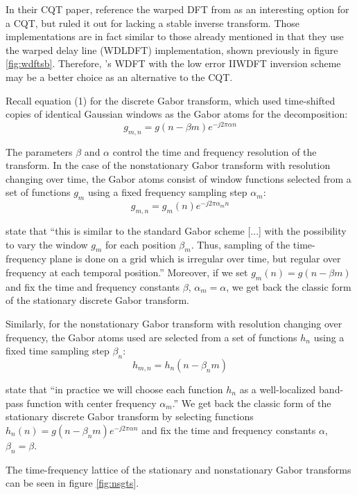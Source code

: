 \documentclass[letter,12pt,notitlepage]{article}
\begin{document}
In their CQT paper, \citet{klapuricqt} reference the warped DFT from \citet{warpedold1, warpedold2} as an interesting option for a CQT, but ruled it out for lacking a stable inverse transform. Those implementations are in fact similar to those already mentioned \cite{earlywarped1, earlywarped2} in that they use the warped delay line (WDLDFT) implementation, shown previously in figure \ref{fig:wdftsb}. Therefore, \citet{warped2}'s WDFT with the low error IIWDFT inversion scheme may be a better choice as an alternative to the CQT.

Recall equation (1) for the discrete Gabor transform, which used time-shifted copies of identical Gaussian windows as the Gabor atoms for the decomposition:
\[ g_{m,n} = g(n-\beta m)e^{-j2\pi \alpha n} \]

The parameters $\beta$ and $\alpha$ control the time and frequency resolution of the transform. In the case of the nonstationary Gabor transform with resolution changing over time, the Gabor atoms consist of window functions selected from a set of functions $g_{m}$ using a fixed frequency sampling step $\alpha_{m}$:
\[ g_{m,n} = g_{m}(n)e^{-j2\pi \alpha_{m} n} \]

\citet{balazs} state that ``this is similar to the standard Gabor scheme [...] with the possibility to vary the window $g_{m}$ for each position $\beta_{m}$. Thus, sampling of the time-frequency plane is done on a grid which is irregular over time, but regular over frequency at each temporal position.'' Moreover, if we set $g_{m}(n) = g(n - \beta m)$ and fix the time and frequency constants $\beta$, $\alpha_{m} = \alpha$, we get back the classic form of the stationary discrete Gabor transform.

Similarly, for the nonstationary Gabor transform with resolution changing over frequency, the Gabor atoms used are selected from a set of functions $h_{n}$ using a fixed time sampling step $\beta_{n}$:
\[ h_{m,n} = h_{n}(n - \beta_{n}m) \]

\citet{balazs} state that ``in practice we will choose each function $h_{n}$ as a well-localized band-pass function with center frequency $\alpha_{m}$.'' We get back the classic form of the stationary discrete Gabor transform by selecting functions $h_{n}(n) = g(n - \beta_{n} m)e^{-j2\pi \alpha n}$ and fix the time and frequency constants $\alpha$, $\beta_{n} = \beta$.

The time-frequency lattice of the stationary and nonstationary Gabor transforms can be seen in figure \ref{fig:nsgts}.
\end{document}

